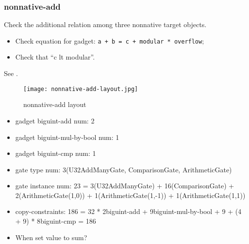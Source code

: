 \subsubsection{nonnative-add}

Check the additional relation among three nonnative target objects.

\begin{itemize}
    \item Check equation for gadget: \verb|a + b = c + modular * overflow|;
    \item Check that ``c lt modular''.
\end{itemize}

See .
\begin{figure}[!ht]
    \centering
    \texttt{[image: nonnative-add-layout.jpg]}
    \caption{nonnative-add layout}
    \label{fig:nonnative-add-layout}
\end{figure}

\begin{itemize}
    \item gadget biguint-add num: 2
    \item gadget biguint-mul-by-bool num: 1
    \item gadget biguint-cmp num: 1
    \item gate type num: 3(U32AddManyGate, ComparisonGate, ArithmeticGate)
    \item gate instance num: 23 = 3(U32AddManyGate) + 16(ComparisonGate) + 2(ArithmeticGate(1,0)) + 1(ArithmeticGate(1,-1)) + 1(ArithmeticGate(1,1))
    \item copy-constraints: 186 = 32 * 2{biguint-add} + 9{biguint-mul-by-bool} + 9 + (4 + 9) * 8{biguint-cmp} = 186
\end{itemize}

\begin{itemize}
    \item When set value to sum?
\end{itemize}
